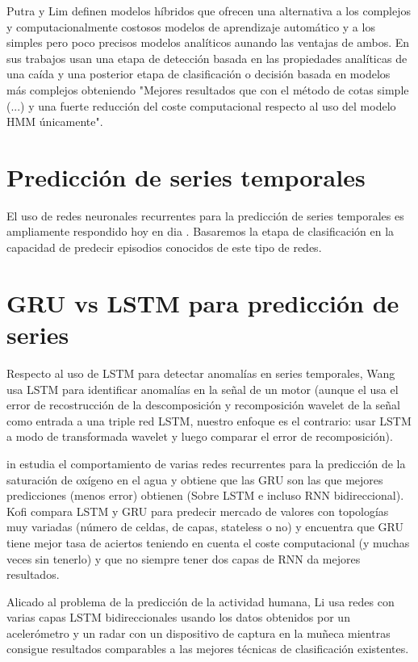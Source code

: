 \documentclass[../tfm.tex]{subfiles}
\begin{document}
Putra \cite{Putra2017} y Lim \cite{Lim2014} definen modelos híbridos que ofrecen una alternativa a los complejos y computacionalmente costosos modelos de aprendizaje automático y a los simples pero poco precisos modelos analíticos aunando las ventajas de ambos. En sus trabajos usan una etapa de detección basada en las propiedades analíticas de una caída y una posterior etapa de clasificación o decisión basada en modelos más complejos obteniendo "Mejores resultados que con el método de cotas simple (...) y una fuerte reducción del coste computacional respecto al uso del modelo HMM únicamente"\cite[p.5]{Lim2014}.

\section{Predicción de series temporales}

El uso de redes neuronales recurrentes para la predicción de series temporales es ampliamente respondido hoy en dia . Basaremos la etapa de clasificación en la capacidad de predecir episodios conocidos de este tipo de redes.

\section{GRU vs LSTM para predicción de series}\label{sa_rnn}

Respecto al uso de LSTM para detectar anomalías en series temporales, Wang \cite{Wang2020} usa LSTM para identificar anomalías en la señal de un motor (aunque el usa el error de recostrucción de la descomposición y recomposición wavelet de la señal como entrada a una triple red LSTM, nuestro enfoque es el contrario: usar LSTM a modo de transformada wavelet y luego comparar el error de recomposición).

in\cite{Qin2019} estudia el comportamiento de varias redes recurrentes para la predicción de la saturación de oxígeno en el agua y obtiene que las GRU son las que mejores predicciones (menos error) obtienen (Sobre LSTM e incluso RNN bidireccional). Kofi \cite{Koffi2020} compara LSTM y GRU para predecir mercado de valores con topologías muy variadas (número de celdas, de capas, stateless o no) y encuentra que GRU tiene mejor tasa de aciertos teniendo en cuenta el coste computacional (y muchas veces sin tenerlo) y que no siempre tener dos capas de RNN da mejores resultados.

Alicado al problema de la predicción de la actividad humana, Li\cite{Li2019} usa redes con varias capas LSTM bidireccionales usando los datos obtenidos por un acelerómetro y un radar con un dispositivo de captura en la muñeca mientras consigue resultados comparables a las mejores técnicas de clasificación existentes.
\end{document}
